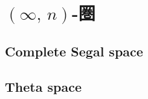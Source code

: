 \documentclass[TQFT_main]{subfiles}
\begin{document}


\section{$(\infty,\, n)$-圏}


\subsection{Complete Segal space}

\subsection{Theta space}
\end{document}
